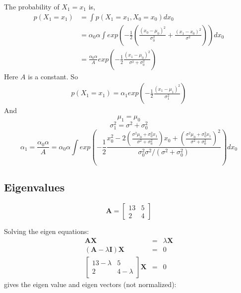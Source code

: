 \documentclass[english,11pt]{article}
\begin{document}
The probability of $X_{1} = x_{1}$ is,
\begin{align*}
p\left ( X_{1}=x_{1} \right )&=\int p\left ( X_{1}=x_{1},X_{0}=x_{0} \right )dx_{0}
\\ &=\alpha _{0}\alpha \int exp\left ( -\frac{1}{2}\left ( \frac{\left ( x_{0}-\mu _{0} \right )^{2}}{\sigma ^{2}_{0}}+ \frac{\left ( x_{1}-x_{0} \right )^{2}}{\sigma^{2} }\right ) \right )dx_{0}
\\ &=\frac{\alpha _{0}\alpha }{A}exp\left ( -\frac{1}{2}\frac{\left ( x_{1}-\mu _{0} \right )^{2}}{\sigma^{2}+\sigma _{0}^{2}} \right )
\end{align*}
Here $A$ is a constant. So 
\begin{align*}
p\left ( X_{1}=x_{1} \right )=\alpha _{1}exp\left ( -\frac{1}{2}\frac{\left ( x_{1}-\mu _{1} \right )^{2}}{\sigma _{1}^{2}} \right )
\end{align*}
And
\begin{equation*}
\mu _{1}=\mu _{0}
\end{equation*}
\begin{equation*}
\sigma _{1}^{2}=\sigma^{2}+\sigma _{0}^{2}
\end{equation*}
\begin{equation*}
\alpha _{1}=\frac{\alpha _{0}\alpha }{A}=\alpha _{0}\alpha\int exp\left (-\frac{1}{2} \frac{x_{0}^{2}-2\left ( \frac{\sigma ^{2}\mu _{0}+\sigma _{0}^{2}x_{1}}{\sigma ^{2}+\sigma _{0}^{2}} \right )x_{0}+\left ( \frac{\sigma ^{2}\mu _{0}+\sigma _{0}^{2}x_{1}}{\sigma ^{2}+\sigma _{0}^{2}} \right )^{2}}{\sigma _{0}^{2}\sigma^{2} /\left ( \sigma ^{2}+\sigma _{0}^{2} \right )} \right )dx_{0}
\end{equation*}

\subsection{Eigenvalues}

\[
\boldsymbol{A}=\left[\begin{array}{cc}
13 & 5\\
2 & 4
\end{array}\right]
\]

Solving the eigen equations:
\begin{eqnarray*}
\boldsymbol{A}\boldsymbol{X} & = & \lambda\boldsymbol{X}\\
(\boldsymbol{A}-\lambda\boldsymbol{I})\boldsymbol{X} & = & 0\\
\left[\begin{array}{cc}
13-\lambda & 5\\
2 & 4-\lambda
\end{array}\right]\boldsymbol{X} & = & 0
\end{eqnarray*}
gives the eigen value and eigen vectors (not normalized):
\end{document}
